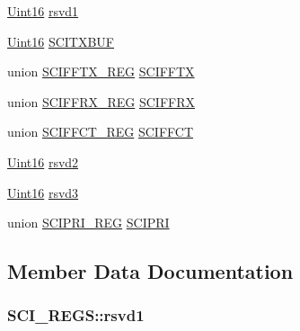 \begin{DoxyCompactItemize}
\hyperlink{_d_s_p2833x___device_8h_a59a9f6be4562c327cbfb4f7e8e18f08b}{Uint16} \hyperlink{struct_s_c_i___r_e_g_s_a3bf86ce470473e0229ea0ce6fdb59526}{rsvd1}
\item 
\hyperlink{_d_s_p2833x___device_8h_a59a9f6be4562c327cbfb4f7e8e18f08b}{Uint16} \hyperlink{struct_s_c_i___r_e_g_s_a1830faf4f46a7ac90a15fdde0b809175}{S\+C\+I\+T\+X\+B\+U\+F}
\item 
union \hyperlink{union_s_c_i_f_f_t_x___r_e_g}{S\+C\+I\+F\+F\+T\+X\+\_\+\+R\+E\+G} \hyperlink{struct_s_c_i___r_e_g_s_a257a51c8ae0fdcb770687842f0092e5e}{S\+C\+I\+F\+F\+T\+X}
\item 
union \hyperlink{union_s_c_i_f_f_r_x___r_e_g}{S\+C\+I\+F\+F\+R\+X\+\_\+\+R\+E\+G} \hyperlink{struct_s_c_i___r_e_g_s_a04926a820c9486f52c09f3d90d9d76f2}{S\+C\+I\+F\+F\+R\+X}
\item 
union \hyperlink{union_s_c_i_f_f_c_t___r_e_g}{S\+C\+I\+F\+F\+C\+T\+\_\+\+R\+E\+G} \hyperlink{struct_s_c_i___r_e_g_s_ace91fa8ec0feb3956cf2da152a9a9e98}{S\+C\+I\+F\+F\+C\+T}
\item 
\hyperlink{_d_s_p2833x___device_8h_a59a9f6be4562c327cbfb4f7e8e18f08b}{Uint16} \hyperlink{struct_s_c_i___r_e_g_s_a60904f5f14eaeec9260b9361452ab37d}{rsvd2}
\item 
\hyperlink{_d_s_p2833x___device_8h_a59a9f6be4562c327cbfb4f7e8e18f08b}{Uint16} \hyperlink{struct_s_c_i___r_e_g_s_abac0120a449878bec0347a7833715e4c}{rsvd3}
\item 
union \hyperlink{union_s_c_i_p_r_i___r_e_g}{S\+C\+I\+P\+R\+I\+\_\+\+R\+E\+G} \hyperlink{struct_s_c_i___r_e_g_s_a5691c96c52204e22f1397717184e1762}{S\+C\+I\+P\+R\+I}
\end{DoxyCompactItemize}


\subsection{Member Data Documentation}
\hypertarget{struct_s_c_i___r_e_g_s_a3bf86ce470473e0229ea0ce6fdb59526}{}
\subsubsection[{rsvd1}]{ S\+C\+I\+\_\+\+R\+E\+G\+S\+::rsvd1}\label{struct_s_c_i___r_e_g_s_a3bf86ce470473e0229ea0ce6fdb59526}
\hypertarget{struct_s_c_i___r_e_g_s_a60904f5f14eaeec9260b9361452ab37d}{}
